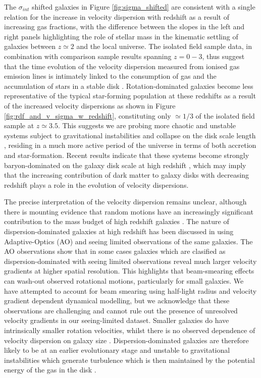 \documentclass[fleqn,usenatbib]{mn2e}
\begin{document}
The $\sigma_{int}$ shifted galaxies in Figure \ref{fig:sigma_shifted} are consistent with a single relation for the increase in velocity dispersion with redshift as a result of increasing gas fractions, with the difference between the slopes in the left and right panels highlighting the role of stellar mass in the kinematic settling of galaxies between $z\simeq2$ and the local universe. 
The isolated field sample data, in combination with comparison sample results spanning $z=0-3$, thus suggest that the time evolution of the velocity dispersion measured from ionised gas emission lines is intimately linked to the consumption of gas and the accumulation of stars in a stable disk \citep[e.g.][]{Law2009,Law2012b,Law2012c,Wisnioski2015}.
Rotation-dominated galaxies become less representative of the typical star-forming population at these redshifts as a result of the increased velocity dispersions as shown in Figure \ref{fig:rdf_and_v_sigma_w_redshift}, constituting only $\simeq1/3$ of the isolated field sample at $z\simeq3.5$.
This suggests we are probing more chaotic and unstable systems subject to gravitational instabilities and collapse on the disk scale length \citep{Burkert2010,Genzel2011}, residing in a much more active period of the universe in terms of both accretion and star-formation.
Recent results indicate that these systems become strongly baryon-dominated on the galaxy disk scale at high redshift \citep{Ubler2017,Lang2017,Genzel2017}, which may imply that the increasing contribution of dark matter to galaxy disks with decreasing redshift plays a role in the evolution of velocity dispersions.   

The precise interpretation of the velocity dispersion remains unclear, although there is mounting evidence that random motions have an increasingly significant contribution to the mass budget of high redshift galaxies \citep[e.g.][]{Kassin2007,Law2009,Burkert2010,Kassin2012,Wuyts2016b,Lang2017,Ubler2017,Genzel2017}.
The nature of dispersion-dominated galaxies at high redshift has been discussed in \cite{Newman2013} using Adaptive-Optics (AO) and seeing limited observations of the same galaxies.
The AO observations show that in some cases galaxies which are clasified as dispersion-dominated with seeing limited observations reveal much larger velocity gradients at higher spatial resolution.
This highlights that beam-smearing effects can wash-out observed rotational motions, particularly for small galaxies.
We have attempted to account for beam smearing using half-light radius and velocity gradient dependent dynamical modelling, but we acknowledge that these observations are challenging and cannot rule out the presence of unresolved velocity gradients in our seeing-limited dataset.
Smaller galaxies do have intrinsically smaller rotation velocities, whilst there is no observed dependence of velocity dispersion on galaxy size \citep[e.g.][]{Newman2013}.
Dispersion-dominated galaxies are therefore likely to be at an earlier evolutionary stage and unstable to gravitational instabilities which generate turbulence which is then maintained by the potential energy of the gas in the disk \citep{Burkert2010,Newman2013}.
\end{document}
